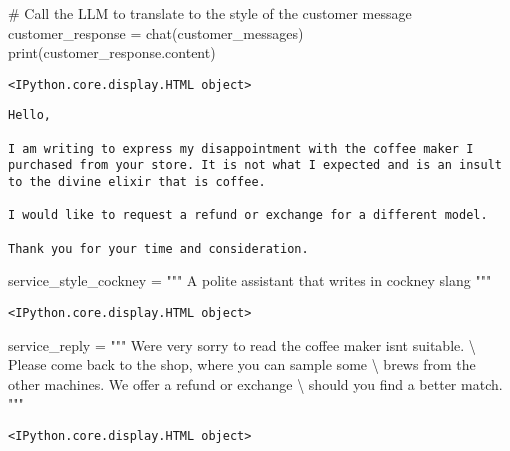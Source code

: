 \documentclass[
  letterpaper,
  DIV=11,
  numbers=noendperiod]{scrreprt}
\newenvironment{Shaded}{\begin{snugshade}}{\end{snugshade}}
\newcommand{\BuiltInTok}[1]{\textcolor[rgb]{0.00,0.23,0.31}{#1}}
\newcommand{\CharTok}[1]{\textcolor[rgb]{0.13,0.47,0.30}{#1}}
\newcommand{\CommentTok}[1]{\textcolor[rgb]{0.37,0.37,0.37}{#1}}
\newcommand{\NormalTok}[1]{\textcolor[rgb]{0.00,0.23,0.31}{#1}}
\newcommand{\OperatorTok}[1]{\textcolor[rgb]{0.37,0.37,0.37}{#1}}
\newcommand{\StringTok}[1]{\textcolor[rgb]{0.13,0.47,0.30}{#1}}
\begin{document}
\begin{Shaded}
\begin{Highlighting}[]
\CommentTok{\# Call the LLM to translate to the style of the customer message}
\NormalTok{customer\_response }\OperatorTok{=}\NormalTok{ chat(customer\_messages)}
\BuiltInTok{print}\NormalTok{(customer\_response.content)}
\end{Highlighting}
\end{Shaded}

\begin{verbatim}
<IPython.core.display.HTML object>
\end{verbatim}

\begin{verbatim}
Hello,

I am writing to express my disappointment with the coffee maker I purchased from your store. It is not what I expected and is an insult to the divine elixir that is coffee.

I would like to request a refund or exchange for a different model.

Thank you for your time and consideration.
\end{verbatim}

\begin{Shaded}
\begin{Highlighting}[]
\NormalTok{service\_style\_cockney }\OperatorTok{=} \StringTok{"""}
\StringTok{A polite assistant that writes in cockney slang}
\StringTok{"""}
\end{Highlighting}
\end{Shaded}

\begin{verbatim}
<IPython.core.display.HTML object>
\end{verbatim}

\begin{Shaded}
\begin{Highlighting}[]
\NormalTok{service\_reply }\OperatorTok{=} \StringTok{"""}
\StringTok{We\textquotesingle{}re very sorry to read the coffee maker isn\textquotesingle{}t suitable. }\CharTok{\textbackslash{}}
\StringTok{Please come back to the shop, where you can sample some }\CharTok{\textbackslash{}}
\StringTok{brews from the other machines. We offer a refund or exchange }\CharTok{\textbackslash{}}
\StringTok{should you find a better match.}
\StringTok{"""}
\end{Highlighting}
\end{Shaded}

\begin{verbatim}
<IPython.core.display.HTML object>
\end{verbatim}
\end{document}
